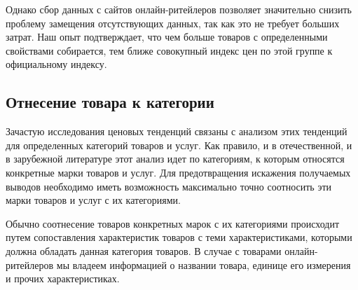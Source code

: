 Однако сбор данных с сайтов онлайн-ритейлеров позволяет значительно снизить проблему замещения отсутствующих данных, так как это не требует больших затрат. Наш опыт подтверждает, что чем больше товаров с определенными свойствами собирается, тем ближе совокупный индекс цен по этой группе к официальному индексу.

\subsection{Отнесение товара к категории}\label{subsec:ch2/sec2/sub3}

Зачастую исследования ценовых тенденций связаны с анализом этих тенденций для определенных категорий товаров и услуг. Как правило, и в отечественной, и в зарубежной литературе этот анализ идет по категориям, к которым относятся конкретные марки товаров и услуг. Для предотвращения искажения получаемых выводов необходимо иметь возможность максимально точно соотносить эти марки товаров и услуг с их категориями.

Обычно соотнесение товаров конкретных марок с их категориями происходит путем сопоставления характеристик товаров с теми характеристиками, которыми должна обладать данная категория товаров. В случае с товарами онлайн-ритейлеров мы владеем информацией о названии товара, единице его измерения и прочих характеристиках.


